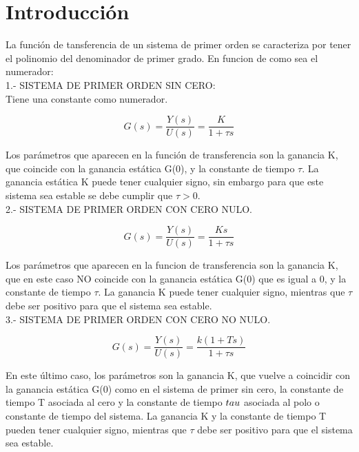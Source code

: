 \documentclass{report}
\newcounter{ns}
\begin{document}
	\section{Introducción}
	La función de tansferencia de un sistema de primer orden se caracteriza por tener el polinomio del denominador de primer grado. En funcion de como sea el numerador:\\
	
	1.- SISTEMA DE PRIMER ORDEN SIN CERO:\\
	Tiene una constante como numerador.
	
	\begin{equation*}
		G(s) = \frac{Y(s)}{U(s)}=\frac{K}{1+\tau s}
	\end{equation*}
	
	Los parámetros que aparecen en la función de transferencia son la ganancia K, que coincide con la ganancia estática G(0), y la constante de tiempo $\tau$. La ganancia estática K puede tener cualquier signo, sin embargo para que este sistema sea estable se debe cumplir que $\tau>0$. \\
	
	2.- SISTEMA DE PRIMER ORDEN CON CERO NULO.
	
	\begin{equation*}
		G(s) = \frac{Y(s)}{U(s)}=\frac{Ks}{1+\tau s}
	\end{equation*}
	
	Los parámetros que aparecen en la funcion de transferencia son la ganancia K, que en este caso NO coincide con la ganancia estática G(0) que es igual a 0, y la constante de tiempo $\tau$. La ganancia K puede tener cualquier signo, mientras que $\tau$ debe ser positivo para que el sistema sea estable.\\
	
	3.- SISTEMA DE PRIMER ORDEN CON CERO NO NULO.
	
	\begin{equation*}
		G(s) = \frac{Y(s)}{U(s)}=\frac{k(1+Ts)}{1+\tau s}
	\end{equation*}
	
	En este último caso, los parámetros son la ganancia K, que vuelve a coincidir con la ganancia estática G(0) como en el sistema de primer sin cero, la constante de tiempo T asociada al cero y la constante de tiempo $\\tau$ asociada al polo o constante de tiempo del sistema. La ganancia K y la constante de tiempo T pueden tener cualquier signo, mientras que $\tau$ debe ser positivo para que el sistema sea estable.
	
\end{document}
